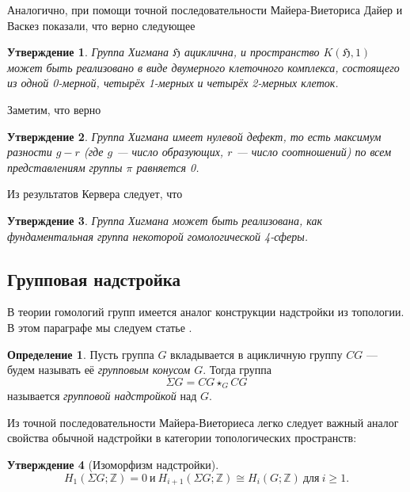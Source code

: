 \documentclass[14pt, dvipsnames]{extarticle}
\newtheorem{statement}{Утверждение}
\theoremstyle{definition}
\newtheorem{defi}{Определение}
\theoremstyle{remark}
\begin{document}
Аналогично, при помощи точной последовательности Майера-Виеториса Дайер и Васкез  показали, что верно следующее

\begin{statement}
Группа Хигмана $\mathfrak{H}$ ациклична, и пространство $K(\mathfrak{H}, 1)$ может быть реализовано в виде двумерного клеточного комплекса, состоящего из одной 0-мерной, четырёх 1-мерных и четырёх 2-мерных клеток.
\end{statement}

Заметим, что верно 

\begin{statement}
Группа Хигмана имеет нулевой дефект, то есть максимум разности $g-r$ (где $g$ --- число образующих, $r$ --- число соотношений) по всем представлениям группы $\pi$ равняется 0.
\end{statement}

Из результатов Кервера следует, что 

\begin{statement}
Группа Хигмана может быть реализована, как фундаментальная группа некоторой гомологической 4-сферы.
\end{statement}

\fi













\subsection{Групповая надстройка}

В теории гомологий групп имеется аналог конструкции надстройки из топологии. В этом параграфе мы следуем статье \cite{BDH}.  

\begin{defi}
Пусть группа $G$ вкладывается в ацикличную группу $CG$ --- будем называть её {\it групповым конусом $G$}. Тогда группа $$\Sigma G=CG\star_G CG$$ называется {\it групповой надстройкой} над $G$.
\end{defi}

Из точной последовательности Майера-Виеториеса легко следует важный аналог свойства обычной надстройки в категории топологических пространств:

\begin{statement}[Изоморфизм надстройки]
 $$H_1(\Sigma G; \mathbb{Z})=0\ \text{и}\ H_{i+1}(\Sigma G; \mathbb{Z})\cong H_i(G; \mathbb{Z})\ \text{для}\ i\geqslant 1.$$
\end{statement}
\end{document}

